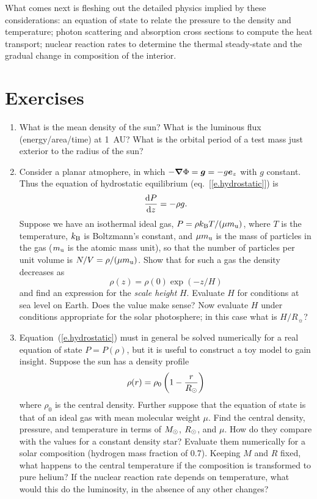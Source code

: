 What comes next is fleshing out the detailed physics implied by these considerations: an equation of state to relate the pressure to the density and temperature; photon scattering and absorption cross sections to compute the heat transport; nuclear reaction rates to determine the thermal steady-state and the gradual change in composition of the interior.

\section{Exercises}\label{s.intro-exercises}

\begin{enumerate}
\item What is the mean density of the sun? What is the luminous flux (energy/area/time) at 1~AU? What is the orbital period of a test mass just exterior to the radius of the sun?

\item Consider a planar atmophere, in which $-\boldsymbol{\nabla}\Phi = \boldsymbol{g} = -g \boldsymbol{e}_{z}$ with $g$ constant. Thus the equation of hydrostatic equilibrium (eq.~[\ref{e.hydrostatic}]) is
\begin{equation}\label{e.planar-hydrostatic}
\frac{\mathrm{d} P}{\mathrm{d} z} = -\rho g.
\end{equation}
Suppose we have an isothermal ideal gas, $P = \rho k_\mathrm{B} T/(\mu m_\mathrm{u})$, where $T$ is the temperature, $k_\mathrm{B}$ is Boltzmann's constant, and $\mu m_\mathrm{u}$ is the mass of particles in the gas ($m_\mathrm{u}$ is the atomic mass unit), so that the number of particles per unit volume is $N/V = \rho/(\mu m_\mathrm{u})$.  Show that for such a gas the density decreases as
\[
\rho(z) = \rho(0) \exp\left(-z/H\right)
\]
and find an expression for the \emph{scale height} $H$.  Evaluate $H$ for conditions at sea level on Earth. Does the value make sense? Now evaluate $H$ under conditions appropriate for the solar photosphere; in this case what is $H/R_{\sun}$?

\item Equation~(\ref{e.hydrostatic}) must in general be solved numerically for a real equation of state $P = P(\rho)$, but it is useful to construct a toy model to gain insight.  Suppose the sun has a density profile
\[ \rho(r) = \rho_{0}\left(1-\frac{r}{R_{\odot}}\right) \]
where $\rho_{0}$ is the central density. Further suppose that the equation of state is that of an ideal gas with mean molecular weight $\mu$.  Find the central density, pressure, and temperature in terms of $M_\odot$, $R_{\odot}$, and $\mu$. How do they compare with the values for a constant density star?  Evaluate them numerically for a solar composition (hydrogen mass fraction of 0.7).  Keeping $M$ and $R$ fixed, what happens to the central temperature if the composition is transformed to pure helium? If the nuclear reaction rate depends on temperature, what would this do the luminosity, in the absence of any other changes?


\end{enumerate}
